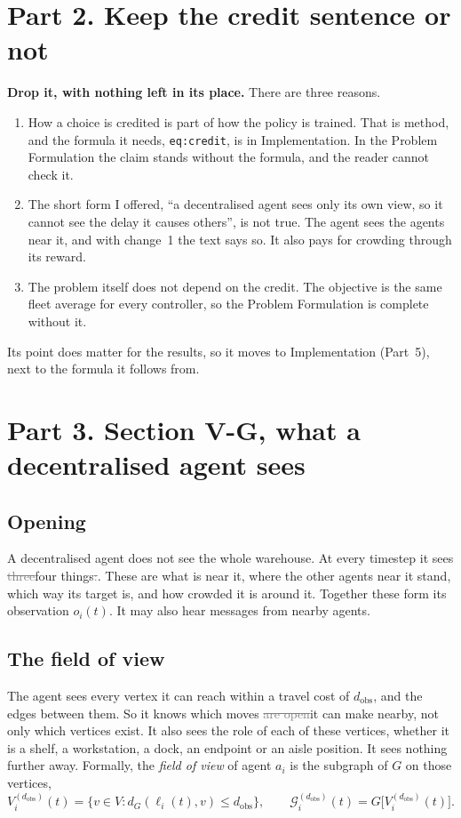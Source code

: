 \documentclass[11pt,a4paper]{article}
\newcommand{\new}[1]{\textcolor{newc}{#1}}
\newcommand{\old}[1]{\textcolor{gray}{\sout{#1}}}
\newcommand{\dobs}{d_{\mathrm{obs}}}
\begin{document}
\section*{Part 2. Keep the credit sentence or not}

\textbf{Drop it, with nothing left in its place.} There are three reasons.
\begin{enumerate}[nosep]
  \item How a choice is credited is part of how the policy is trained. That
        is method, and the formula it needs, \texttt{eq:credit}, is in
        Implementation. In the Problem Formulation the claim stands without
        the formula, and the reader cannot check it.
  \item The short form I offered, ``a decentralised agent sees only its own
        view, so it cannot see the delay it causes others'', is not true. The
        agent sees the agents near it, and with change~1 the text says so. It
        also pays for crowding through its reward.
  \item The problem itself does not depend on the credit. The objective is
        the same fleet average for every controller, so the Problem
        Formulation is complete without it.
\end{enumerate}
Its point does matter for the results, so it moves to Implementation
(Part~5), next to the formula it follows from.

\section*{Part 3. Section V-G, what a decentralised agent sees}

\subsection*{Opening}
A decentralised agent does not see the whole warehouse. At every timestep it
sees \old{three}\new{four} things\old{:}\new{.} \new{These are} what is near
it, \new{where the other agents near it stand,} which way its target is, and
how crowded it is around it. Together these form its observation $o_i(t)$. It
may also hear messages from nearby agents.

\subsection*{The field of view}
The agent sees every vertex it can reach within a travel cost of $\dobs$, and
the edges between them. So it knows which moves \old{are open}\new{it can make}
nearby, not only which vertices exist. \new{It also sees the role of each of
these vertices, whether it is a shelf, a workstation, a dock, an endpoint or
an aisle position.} It sees nothing further away. Formally, the \emph{field of
view} of agent $a_i$ is the subgraph of $G$ on those vertices,
\[
  V^{(\dobs)}_i(t) = \{ v \in V : d_G(\ell_i(t), v) \le \dobs \}, \qquad
  \mathcal{G}^{(\dobs)}_i(t) = G\bigl[V^{(\dobs)}_i(t)\bigr]. \tag{18}
\]
\end{document}
